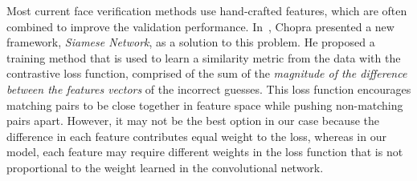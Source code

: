 Most current face verification methods use hand-crafted features, which are
often combined to improve the validation performance. In~\cite{chopra05},
Chopra presented a new framework, \emph{Siamese Network}, as a solution to this
problem. He proposed a training method that is used to learn a similarity
metric from the data with the contrastive loss function, comprised of the sum
of the \emph{magnitude of the difference between the features vectors} of the
incorrect guesses. This loss function encourages matching pairs to be close
together in feature space while pushing non-matching pairs apart. However, it
may not be the best option in our case because the difference in each feature
contributes equal weight to the loss, whereas in our model, each feature may
require different weights in the loss function that is not proportional to the
weight learned in the convolutional network.

